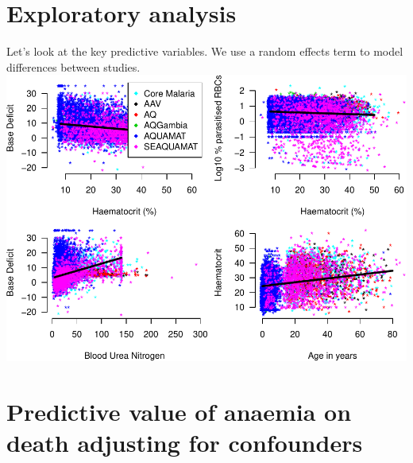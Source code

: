\documentclass[]{article}
\newenvironment{Shaded}{\begin{snugshade}}{\end{snugshade}}
\newcommand{\KeywordTok}[1]{\textcolor[rgb]{0.13,0.29,0.53}{\textbf{#1}}}
\newcommand{\DecValTok}[1]{\textcolor[rgb]{0.00,0.00,0.81}{#1}}
\newcommand{\StringTok}[1]{\textcolor[rgb]{0.31,0.60,0.02}{#1}}
\newcommand{\CommentTok}[1]{\textcolor[rgb]{0.56,0.35,0.01}{\textit{#1}}}
\newcommand{\OperatorTok}[1]{\textcolor[rgb]{0.81,0.36,0.00}{\textbf{#1}}}
\newcommand{\NormalTok}[1]{#1}
\begin{document}
\begin{Shaded}
\end{Shaded}

\section{Exploratory analysis}\label{exploratory-analysis}

Let's look at the key predictive variables. We use a random effects term
to model differences between studies.
\includegraphics{LegacyAnalysis_files/figure-latex/ExploratoryPlots-1.pdf}

\section{Predictive value of anaemia on death adjusting for
confounders}\label{predictive-value-of-anaemia-on-death-adjusting-for-confounders}
\end{document}
